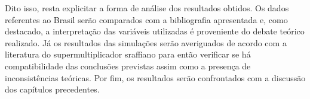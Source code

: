  



Dito isso, resta explicitar a forma de análise dos resultados obtidos. Os dados referentes ao Brasil serão comparados com a bibliografia apresentada e, como destacado, a interpretação das variáveis utilizadas é proveniente do debate teórico realizado. Já os resultados das simulações serão averiguados de acordo com a literatura do supermultiplicador sraffiano para então verificar se há compatibilidade das conclusões previstas assim como a presença de inconsistências teóricas. Por fim, os resultados serão confrontados com a discussão dos capítulos precedentes.


\begin{comment}
=================================================================================
					Temporariamente descartado
=================================================================================

Como esperado, essa crise está sendo alvo das mais diferentes 
interpretações.
Grosso modo, boa parte da literatura alveja as políticas econômicas como fonte desta desaceleração dinâmica, seja por serem elas austeras \cite{serrano_demanda_2015}, intervencionistas \cite{barbosa_filho_crise_2017}, estruturais \cite{bacha_saida_2017} ou até mesmo decorrentes das limitações da ossatura do Estado desenvolvimentista \cite{carneiro_economia_2017}. Com isso, indicam-se as fragilidades do padrão de crescimento brasileiro decorrentes das medidas inadequadas de política econômica, mas argumenta-se aqui que existem fatores estruturais que devem ser considerados.

\end{comment}